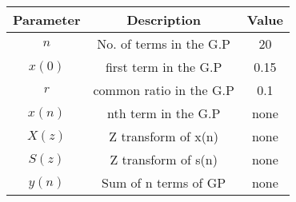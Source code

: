 \renewcommand{\arraystretch}{1.5}
\begin{tabular}{|c|c|c|}
\hline
Parameter & Description & Value \\\hline
\( n \) & No. of terms in the G.P &20 \\\hline
\(x(0) \) & first term in the G.P&0.15 \\\hline
\( r \) & common ratio in the G.P& 0.1 \\\hline
\( x(n) \) & nth term in the G.P& none \\\hline
\( X(z) \) & Z transform of x(n)& none \\\hline
\( S(z) \) & Z transform of s(n)& none \\\hline
\(y(n)\)& Sum of n terms of GP& none\\\hline
\end{tabular}

